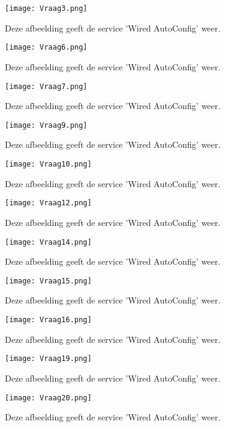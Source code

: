 \begin{figure}[H]
	\centering
	\texttt{[image: Vraag3.png]}
	\caption{Deze afbeelding geeft de service 'Wired AutoConfig' weer.}
\end{figure}

\begin{figure}[H]
	\centering
	\texttt{[image: Vraag6.png]}
	\caption{Deze afbeelding geeft de service 'Wired AutoConfig' weer.}
\end{figure}

\begin{figure}[H]
	\centering
	\texttt{[image: Vraag7.png]}
	\caption{Deze afbeelding geeft de service 'Wired AutoConfig' weer.}
\end{figure}

\begin{figure}[H]
	\centering
	\texttt{[image: Vraag9.png]}
	\caption{Deze afbeelding geeft de service 'Wired AutoConfig' weer.}
\end{figure}

\begin{figure}[H]
	\centering
	\texttt{[image: Vraag10.png]}
	\caption{Deze afbeelding geeft de service 'Wired AutoConfig' weer.}
\end{figure}

\begin{figure}[H]
	\centering
	\texttt{[image: Vraag12.png]}
	\caption{Deze afbeelding geeft de service 'Wired AutoConfig' weer.}
\end{figure}
\begin{figure}[H]
	\centering
	\texttt{[image: Vraag14.png]}
	\caption{Deze afbeelding geeft de service 'Wired AutoConfig' weer.}
\end{figure}
\begin{figure}[H]
	\centering
	\texttt{[image: Vraag15.png]}
	\caption{Deze afbeelding geeft de service 'Wired AutoConfig' weer.}
\end{figure}
\begin{figure}[H]
	\centering
	\texttt{[image: Vraag16.png]}
	\caption{Deze afbeelding geeft de service 'Wired AutoConfig' weer.}
\end{figure}
\begin{figure}[H]
	\centering
	\texttt{[image: Vraag19.png]}
	\caption{Deze afbeelding geeft de service 'Wired AutoConfig' weer.}
\end{figure}
\begin{figure}[H]
	\centering
	\texttt{[image: Vraag20.png]}
	\caption{Deze afbeelding geeft de service 'Wired AutoConfig' weer.}
\end{figure}

